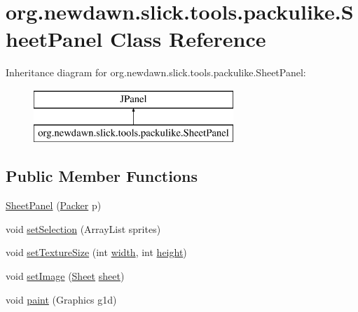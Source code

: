 \hypertarget{classorg_1_1newdawn_1_1slick_1_1tools_1_1packulike_1_1_sheet_panel}{}\section{org.\+newdawn.\+slick.\+tools.\+packulike.\+Sheet\+Panel Class Reference}
\label{classorg_1_1newdawn_1_1slick_1_1tools_1_1packulike_1_1_sheet_panel}
Inheritance diagram for org.\+newdawn.\+slick.\+tools.\+packulike.\+Sheet\+Panel\+:\begin{figure}[H]
\begin{center}
\leavevmode
\includegraphics[height=2.000000cm]{classorg_1_1newdawn_1_1slick_1_1tools_1_1packulike_1_1_sheet_panel}
\end{center}
\end{figure}
\subsection*{Public Member Functions}
\begin{DoxyCompactItemize}
\item 
\mbox{\hyperlink{classorg_1_1newdawn_1_1slick_1_1tools_1_1packulike_1_1_sheet_panel_ae01d1800c5c8933f3dcd7ed331fe80cf}{Sheet\+Panel}} (\mbox{\hyperlink{classorg_1_1newdawn_1_1slick_1_1tools_1_1packulike_1_1_packer}{Packer}} p)
\item 
void \mbox{\hyperlink{classorg_1_1newdawn_1_1slick_1_1tools_1_1packulike_1_1_sheet_panel_a059d3b0d4b88b10f3198da5a4b8394e4}{set\+Selection}} (Array\+List sprites)
\item 
void \mbox{\hyperlink{classorg_1_1newdawn_1_1slick_1_1tools_1_1packulike_1_1_sheet_panel_a46f4e2aa8cc13578241c6df33b0fa852}{set\+Texture\+Size}} (int \mbox{\hyperlink{classorg_1_1newdawn_1_1slick_1_1tools_1_1packulike_1_1_sheet_panel_a9a26b63a540293ca2f8d9f5a8290fdf6}{width}}, int \mbox{\hyperlink{classorg_1_1newdawn_1_1slick_1_1tools_1_1packulike_1_1_sheet_panel_afa5b07570c513dfef8a1be4735c8da3a}{height}})
\item 
void \mbox{\hyperlink{classorg_1_1newdawn_1_1slick_1_1tools_1_1packulike_1_1_sheet_panel_ad7fd79342e05287225c4a79400a9ec3e}{set\+Image}} (\mbox{\hyperlink{classorg_1_1newdawn_1_1slick_1_1tools_1_1packulike_1_1_sheet}{Sheet}} \mbox{\hyperlink{classorg_1_1newdawn_1_1slick_1_1tools_1_1packulike_1_1_sheet_panel_a0b2d5c2c29f98d3da15ad5be1e666286}{sheet}})
\item 
void \mbox{\hyperlink{classorg_1_1newdawn_1_1slick_1_1tools_1_1packulike_1_1_sheet_panel_a528de0e88d97cf5173cff625eec239a0}{paint}} (Graphics g1d)
\end{DoxyCompactItemize}
